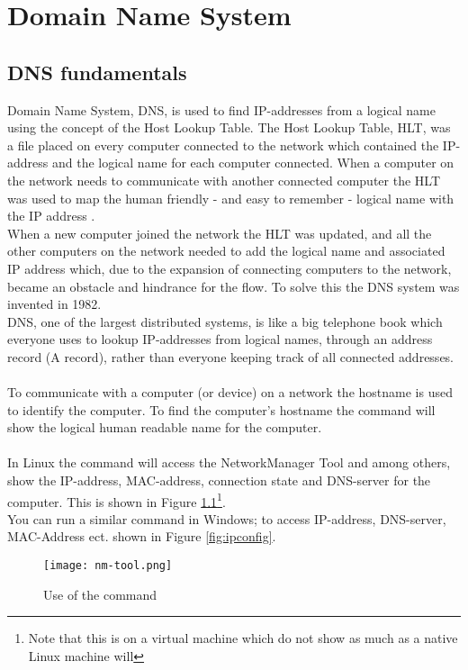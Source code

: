\documentclass[Preamble]{subfiles}
\begin{document}
\chapter{Domain Name System}

\section{DNS fundamentals}
Domain Name System, DNS, is used to find IP-addresses from a logical name using the concept of the Host Lookup Table.
The Host Lookup Table, HLT, was a file placed on every computer connected to the network which contained the IP-address and the logical name for each computer connected. When a computer on the network needs to communicate with another connected computer the HLT was used to map the human friendly - and easy to remember - logical name with the IP address \cite[History section]{wiki-hosts}.
\\When a new computer joined the network the HLT was updated, and all the other computers on the network needed to add the logical name and associated IP address which, due to the expansion of connecting computers to the network, became an obstacle and hindrance for the flow. To solve this the DNS system was invented in 1982\cite[History section]{wiki-dns}.
\\DNS, one of the largest distributed systems, is like a big telephone book which everyone uses to lookup IP-addresses from logical names, through an address record (A record)\cite[p. 209-210]{Tanenbaum}, rather than everyone keeping track of all connected addresses.
\\
\\
To communicate with a computer (or device) on a network the hostname is used to identify the computer. To find the computer's hostname the command  will show the logical human readable name for the computer. 
\\
\\
In Linux the command  will access the NetworkManager Tool and among others, show the IP-address, MAC-address, connection state and DNS-server for the computer.
This is shown in Figure \ref{fig:nm-tool}\footnote{Note that this is on a virtual machine which do not show as much as a native Linux machine will}.
\\
You can run a similar command in Windows;  to access IP-address, DNS-server, MAC-Address ect. shown in Figure \ref{fig:ipconfig}.


\begin{figure}[H]
\centering
\texttt{[image: nm-tool.png]}
\caption{Use of the command }
\label{fig:nm-tool}
\end{figure}
\end{document}
